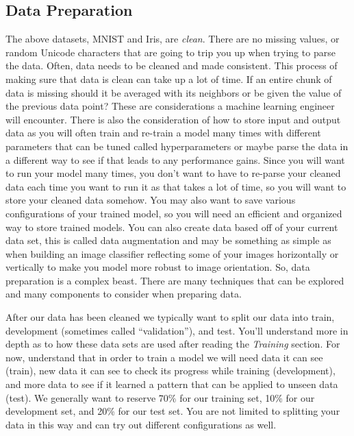 \documentclass{article}
\begin{document}
\newpage
\subsection{Data Preparation}
The above datasets, MNIST and Iris, are \textit{clean}. There are no missing values, or random Unicode characters that are going to trip you up when trying to parse the data. Often, data needs to be cleaned and made consistent. This process of making sure that data is clean can take up a lot of time. If an entire chunk of data is missing should it be averaged with its neighbors or be given the value of the previous data point? These are considerations a machine learning engineer will encounter. There is also the consideration of how to store input and output data as you will often train and re-train a model many times with different parameters that can be tuned called hyperparameters or maybe parse the data in a different way to see if that leads to any performance gains. Since you will want to run your model many times, you don't want to have to re-parse your cleaned data each time you want to run it as that takes a lot of time, so you will want to store your cleaned data somehow. You may also want to save various configurations of your trained model, so you will need an efficient and organized way to store trained models. You can also create data based off of your current data set, this is called data augmentation and may be something as simple as when building an image classifier reflecting some of your images horizontally or vertically to make you model more robust to image orientation. So, data preparation is a complex beast. There are many techniques that can be explored and many components to consider when preparing data.

After our data has been cleaned we typically want to split our data into train, development (sometimes called ``validation''), and test. You'll understand more in depth as to how these data sets are used after reading the \textit{Training} section. For now, understand that in order to train a model we will need data it can see (train), new data it can see to check its progress while training (development), and more data to see if it learned a pattern that can be applied to unseen data (test). We generally want to reserve 70\% for our training set, 10\% for our development set, and 20\% for our test set. You are not limited to splitting your data in this way and can try out different configurations as well.
\end{document}
